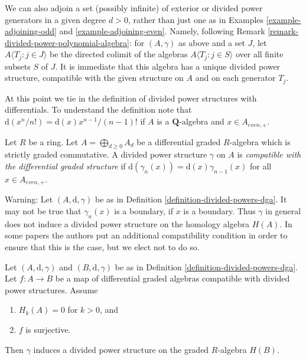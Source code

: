 \begin{remark}
\label{remark-adjoining-set-of-variables}
We can also adjoin a set (possibly infinite) of exterior or divided
power generators in a given degree $d > 0$, rather than just one
as in Examples \ref{example-adjoining-odd}
and \ref{example-adjoining-even}. Namely, 
following Remark \ref{remark-divided-power-polynomial-algebra}:
for $(A,\gamma)$
as above and a set $J$, let $A\langle
T_j:j\in J\rangle$ be the directed colimit of the algebras
$A\langle T_j:j\in S\rangle$ over all finite subsets $S$
of $J$. It is immediate that this algebra has a unique divided power
structure, compatible with the given structure on $A$ and on
each generator $T_j$.
\end{remark}

\noindent
At this point we tie in the definition of divided power structures
with differentials. To understand the definition note that
$\text{d}(x^n/n!) = \text{d}(x) x^{n - 1}/(n - 1)!$ if $A$
is a $\mathbf{Q}$-algebra and $x \in A_{even, +}$.

\begin{definition}
\label{definition-divided-powers-dga}
Let $R$ be a ring. Let $A = \bigoplus_{d \geq 0} A_d$ be a
differential graded $R$-algebra which is strictly graded commutative.
A divided power structure $\gamma$ on $A$ is {\it compatible with
the differential graded structure} if
$\text{d}(\gamma_n(x)) = \text{d}(x) \gamma_{n - 1}(x)$ for
all $x \in A_{even, +}$.
\end{definition}

\noindent
Warning: Let $(A, \text{d}, \gamma)$ be as in
Definition \ref{definition-divided-powers-dga}.
It may not be true that $\gamma_n(x)$ is a boundary, if
$x$ is a boundary. Thus $\gamma$ in general does not induce
a divided power structure on the homology algebra $H(A)$.
In some papers the authors put an additional compatibility
condition in order to ensure that this is the case, but we elect
not to do so.

\begin{lemma}
\label{lemma-dpdga-good}
Let $(A, \text{d}, \gamma)$ and $(B, \text{d}, \gamma)$ be as in
Definition \ref{definition-divided-powers-dga}. Let $f : A \to B$
be a map of differential graded algebras compatible with divided
power structures. Assume
\begin{enumerate}
\item $H_k(A) = 0$ for $k > 0$, and
\item $f$ is surjective.
\end{enumerate}
Then $\gamma$ induces a divided power structure on the graded
$R$-algebra $H(B)$.
\end{lemma}

